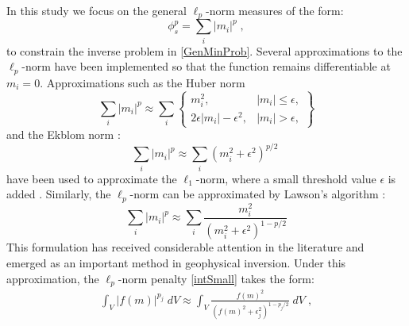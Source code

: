 \documentclass[extra,referee]{gji}
\begin{document}
In this study we focus on the general $\ell_p$-norm measures of the form:
\begin{equation} \label{eq:lpreg}
\phi_s^{p} = \sum_{i} {|m_i|}^{p} \;,
\end{equation}
to constrain the inverse problem in \eqref{GenMinProb}.
Several approximations to the $\ell_p$-norm have been implemented so that the function remains differentiable at $m_i = 0$. Approximations such as the Huber norm \cite[]{Huber64}
\[
\sum_{i} {|m_i|}^p \approx \sum_{i} \left\{\begin{array}{lr}
m_i^2, & |m_i| \leq \epsilon,\\
2\epsilon|m_i|-\epsilon^2, & |m_i| > \epsilon,
\end{array}\right\}
\]
and the Ekblom norm \cite[]{Ekblom73}:
\begin{equation}\label{Ekblom}
\sum_{i} {|m_i |}^p \approx \sum_{i} {(m_i^2 + \epsilon^2)}^{p/2} \;
\end{equation}
have been used to approximate the $\ell_1$-norm, where a small threshold value $\epsilon$ is added \cite[]{Li93, Gorodnitsky97, FarquharsonOldenburg98}.
Similarly, the $\ell_p$-norm can be approximated by Lawson's algorithm \cite[]{Lawson61}:
\begin{equation} \label{eq:Lawson}
\sum_{i} {|m_i |}^p \approx \sum_{i}\frac{m_i^2}{{{(m_i^{2} + \epsilon^2 )}^{1-p/2}} }
\end{equation}
This formulation has received considerable attention in the literature and emerged as an important method in geophysical inversion.
Under this approximation, the $\ell_p$-norm penalty \eqref{intSmall} takes the form:
\begin{equation}\label{eq:IntegralIRLS}
\begin{split}
	\int_V | f(m) |^{p_j} \;dV \approx \int_V{\frac{ {f (m)}^2}{\left( {{f (m)}}^{2} + \epsilon_j^2 \right)^{1-p_j/2 }}\;dV} \;,
\end{split}
\end{equation}
\end{document}
